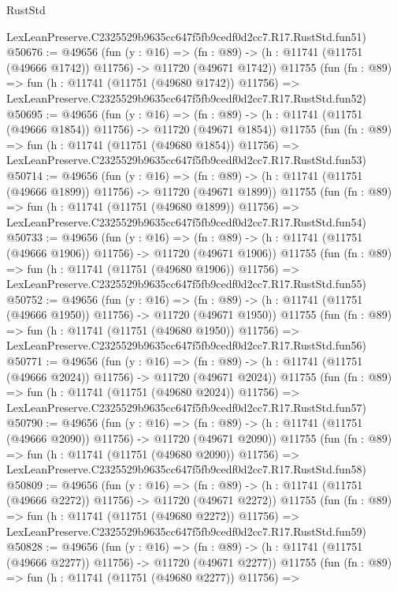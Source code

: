 \begin{lexlean}{RustStd}
\begin{coremodule}
    LexLeanPreserve.C2325529b9635cc647f5fb9cedf0d2cc7.R17.RustStd.fun51)
@50676 := @49656
    (fun (y : @16) =>
    (fn : @89) -> (h : @11741 (@11751 (@49666 @1742)) @11756) -> @11720 (@49671 @1742))
    @11755
    (fun (fn : @89) =>
    fun (h : @11741 (@11751 (@49680 @1742)) @11756) =>
    LexLeanPreserve.C2325529b9635cc647f5fb9cedf0d2cc7.R17.RustStd.fun52)
@50695 := @49656
    (fun (y : @16) =>
    (fn : @89) -> (h : @11741 (@11751 (@49666 @1854)) @11756) -> @11720 (@49671 @1854))
    @11755
    (fun (fn : @89) =>
    fun (h : @11741 (@11751 (@49680 @1854)) @11756) =>
    LexLeanPreserve.C2325529b9635cc647f5fb9cedf0d2cc7.R17.RustStd.fun53)
@50714 := @49656
    (fun (y : @16) =>
    (fn : @89) -> (h : @11741 (@11751 (@49666 @1899)) @11756) -> @11720 (@49671 @1899))
    @11755
    (fun (fn : @89) =>
    fun (h : @11741 (@11751 (@49680 @1899)) @11756) =>
    LexLeanPreserve.C2325529b9635cc647f5fb9cedf0d2cc7.R17.RustStd.fun54)
@50733 := @49656
    (fun (y : @16) =>
    (fn : @89) -> (h : @11741 (@11751 (@49666 @1906)) @11756) -> @11720 (@49671 @1906))
    @11755
    (fun (fn : @89) =>
    fun (h : @11741 (@11751 (@49680 @1906)) @11756) =>
    LexLeanPreserve.C2325529b9635cc647f5fb9cedf0d2cc7.R17.RustStd.fun55)
@50752 := @49656
    (fun (y : @16) =>
    (fn : @89) -> (h : @11741 (@11751 (@49666 @1950)) @11756) -> @11720 (@49671 @1950))
    @11755
    (fun (fn : @89) =>
    fun (h : @11741 (@11751 (@49680 @1950)) @11756) =>
    LexLeanPreserve.C2325529b9635cc647f5fb9cedf0d2cc7.R17.RustStd.fun56)
@50771 := @49656
    (fun (y : @16) =>
    (fn : @89) -> (h : @11741 (@11751 (@49666 @2024)) @11756) -> @11720 (@49671 @2024))
    @11755
    (fun (fn : @89) =>
    fun (h : @11741 (@11751 (@49680 @2024)) @11756) =>
    LexLeanPreserve.C2325529b9635cc647f5fb9cedf0d2cc7.R17.RustStd.fun57)
@50790 := @49656
    (fun (y : @16) =>
    (fn : @89) -> (h : @11741 (@11751 (@49666 @2090)) @11756) -> @11720 (@49671 @2090))
    @11755
    (fun (fn : @89) =>
    fun (h : @11741 (@11751 (@49680 @2090)) @11756) =>
    LexLeanPreserve.C2325529b9635cc647f5fb9cedf0d2cc7.R17.RustStd.fun58)
@50809 := @49656
    (fun (y : @16) =>
    (fn : @89) -> (h : @11741 (@11751 (@49666 @2272)) @11756) -> @11720 (@49671 @2272))
    @11755
    (fun (fn : @89) =>
    fun (h : @11741 (@11751 (@49680 @2272)) @11756) =>
    LexLeanPreserve.C2325529b9635cc647f5fb9cedf0d2cc7.R17.RustStd.fun59)
@50828 := @49656
    (fun (y : @16) =>
    (fn : @89) -> (h : @11741 (@11751 (@49666 @2277)) @11756) -> @11720 (@49671 @2277))
    @11755
    (fun (fn : @89) =>
    fun (h : @11741 (@11751 (@49680 @2277)) @11756) =>

\end{coremodule}
\end{lexlean}

